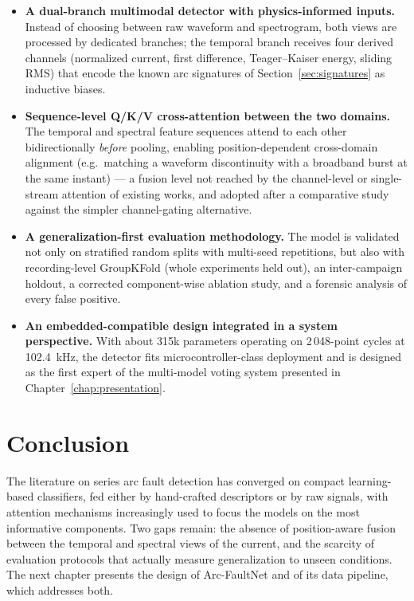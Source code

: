 \begin{itemize}[itemsep=2pt]
    \item \textbf{A dual-branch multimodal detector with physics-informed inputs.} Instead of choosing between raw waveform and spectrogram, both views are processed by dedicated branches; the temporal branch receives four derived channels (normalized current, first difference, Teager--Kaiser energy, sliding RMS) that encode the known arc signatures of Section~\ref{sec:signatures} as inductive biases.
    \item \textbf{Sequence-level Q/K/V cross-attention between the two domains.} The temporal and spectral feature sequences attend to each other bidirectionally \emph{before} pooling, enabling position-dependent cross-domain alignment (e.g.\ matching a waveform discontinuity with a broadband burst at the same instant) --- a fusion level not reached by the channel-level or single-stream attention of existing works, and adopted after a comparative study against the simpler channel-gating alternative.
    \item \textbf{A generalization-first evaluation methodology.} The model is validated not only on stratified random splits with multi-seed repetitions, but also with recording-level GroupKFold (whole experiments held out), an inter-campaign holdout, a corrected component-wise ablation study, and a forensic analysis of every false positive.
    \item \textbf{An embedded-compatible design integrated in a system perspective.} With about 315k parameters operating on 2\,048-point cycles at 102.4~kHz, the detector fits microcontroller-class deployment and is designed as the first expert of the multi-model voting system presented in Chapter~\ref{chap:presentation}.
\end{itemize}

\section*{Conclusion}

The literature on series arc fault detection has converged on compact learning-based classifiers, fed either by hand-crafted descriptors or by raw signals, with attention mechanisms increasingly used to focus the models on the most informative components. Two gaps remain: the absence of position-aware fusion between the temporal and spectral views of the current, and the scarcity of evaluation protocols that actually measure generalization to unseen conditions. The next chapter presents the design of Arc-FaultNet and of its data pipeline, which addresses both.
